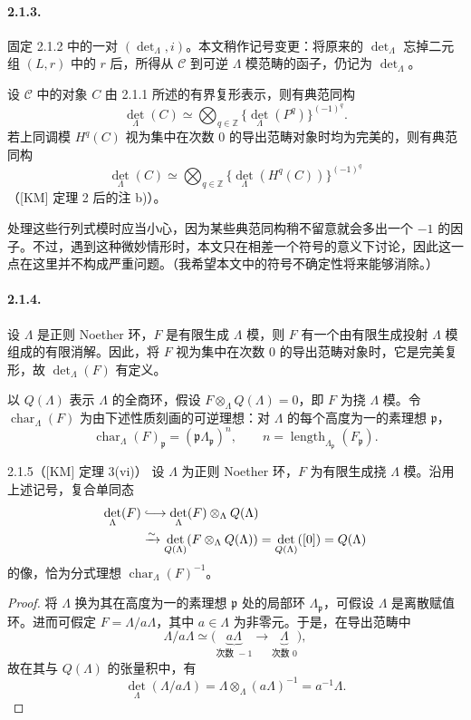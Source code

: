 \paragraph{2.1.3.}
固定 2.1.2 中的一对 $(\det_\Lambda,i)$。本文稍作记号变更：将原来的 $\det_\Lambda$ 忘掉二元组 $(L,r)$ 中的 $r$ 后，所得从 $\mathscr C$ 到可逆 $\Lambda$ 模范畴的函子，仍记为 $\det_\Lambda$。

设 $\mathscr C$ 中的对象 $C$ 由 2.1.1 所述的有界复形表示，则有典范同构
\[
\det_\Lambda(C)\simeq\bigotimes_{q\in\mathbb Z}
\{\det_\Lambda(P^q)\}^{(-1)^q}.
\]
若上同调模 $H^q(C)$ 视为集中在次数 $0$ 的导出范畴对象时均为完美的，则有典范同构
\[
\det_\Lambda(C)\simeq\bigotimes_{q\in\mathbb Z}
\{\det_\Lambda(H^q(C))\}^{(-1)^q}
\]
（[KM] 定理 2 后的注 b)）。

处理这些行列式模时应当小心，因为某些典范同构稍不留意就会多出一个 $-1$ 的因子。不过，遇到这种微妙情形时，本文只在相差一个符号的意义下讨论，因此这一点在这里并不构成严重问题。（我希望本文中的符号不确定性将来能够消除。）

\paragraph{2.1.4.}
设 $\Lambda$ 是正则 Noether 环，$F$ 是有限生成 $\Lambda$ 模，则 $F$ 有一个由有限生成投射 $\Lambda$ 模组成的有限消解。因此，将 $F$ 视为集中在次数 $0$ 的导出范畴对象时，它是完美复形，故 $\det_\Lambda(F)$ 有定义。

以 $Q(\Lambda)$ 表示 $\Lambda$ 的全商环，假设 $F\otimes_\Lambda Q(\Lambda)=0$，即 $F$ 为挠 $\Lambda$ 模。令
$\operatorname{char}_\Lambda(F)$ 为由下述性质刻画的可逆理想：对 $\Lambda$ 的每个高度为一的素理想 $\mathfrak p$，
\[
\operatorname{char}_\Lambda(F)_{\mathfrak p}
=(\mathfrak p\Lambda_{\mathfrak p})^n,
\qquad n=\operatorname{length}_{\Lambda_{\mathfrak p}}(F_{\mathfrak p}).
\]

\begin{statement}{2.1.5（[KM] 定理 3(vi)）}
设 $\Lambda$ 为正则 Noether 环，$F$ 为有限生成挠 $\Lambda$ 模。沿用上述记号，复合单同态
\begin{align*}
\det_\Lambda(F)&\lhook\joinrel\longrightarrow
\det_\Lambda(F)\otimes_\Lambda Q(\Lambda)\\
&\xrightarrow{\sim}\det_{Q(\Lambda)}(F\otimes_\Lambda Q(\Lambda))
=\det_{Q(\Lambda)}([0])=Q(\Lambda)
\end{align*}
的像，恰为分式理想 $\operatorname{char}_\Lambda(F)^{-1}$。
\end{statement}
\begin{proof}
将 $\Lambda$ 换为其在高度为一的素理想 $\mathfrak p$ 处的局部环 $\Lambda_{\mathfrak p}$，可假设 $\Lambda$ 是离散赋值环。进而可假定 $F=\Lambda/a\Lambda$，其中 $a\in\Lambda$ 为非零元。于是，在导出范畴中
\[
\Lambda/a\Lambda\simeq
\bigl(\underbrace{a\Lambda}_{\text{次数 }-1}
\longrightarrow\underbrace{\Lambda}_{\text{次数 }0}\bigr),
\]
故在其与 $Q(\Lambda)$ 的张量积中，有
\[
\det_\Lambda(\Lambda/a\Lambda)
=\Lambda\otimes_\Lambda(a\Lambda)^{-1}=a^{-1}\Lambda.
\]
\end{proof}

